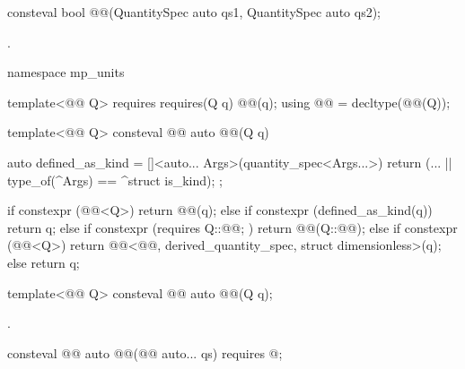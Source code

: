 \begin{itemdecl}
consteval bool @@(QuantitySpec auto qs1, QuantitySpec auto qs2);
\end{itemdecl}

\begin{itemdescr}
\pnum
\returns
{}.
\end{itemdescr}

\begin{codeblock}
namespace mp_units {

template<@@ Q>
  requires requires(Q q) { @@(q); }
using @@ = decltype(@@(Q{}));

template<@@ Q>
consteval @@ auto @@(Q q)
{
  auto defined_as_kind = []<auto... Args>(quantity_spec<Args...>) {
    return (... || type_of(^Args) == ^struct is_kind);
  };

  if constexpr (@@<Q>) {
    return @@(q);
  } else if constexpr (defined_as_kind(q)) {
    return q;
  } else if constexpr (requires { Q::@@; }) {
    return @@(Q::@@);
  } else if constexpr (@@<Q>) {
    return @@<@@, derived_quantity_spec, struct dimensionless>(q);
  } else {
    return q;
  }
}

}
\end{codeblock}

\begin{itemdecl}
template<@@ Q>
consteval @@ auto @@(Q q);
\end{itemdecl}

\begin{itemdescr}
\pnum
\returns
{}.
\end{itemdescr}

\begin{itemdecl}
consteval @@ auto @@(@@ auto... qs)
  requires @\seebelownc@;
\end{itemdecl}

